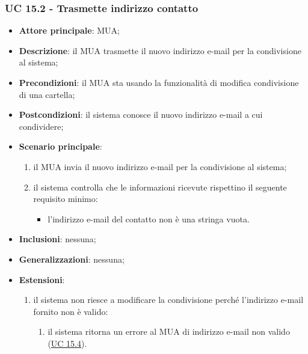     \subsubsection{UC 15.2 - Trasmette indirizzo contatto} \label{sec:UC15.2}
    \begin{itemize}
        \item \textbf{Attore principale}: MUA;
        \item \textbf{Descrizione}: il MUA trasmette il nuovo indirizzo e-mail per la condivisione al sistema;
        \item \textbf{Precondizioni}: il MUA sta usando la funzionalità di modifica condivisione di una cartella;
        \item \textbf{Postcondizioni}: il sistema conosce il nuovo indirizzo e-mail a cui condividere;
        \item \textbf{Scenario principale}:
            \begin{enumerate}
                \item il MUA invia il nuovo indirizzo e-mail per la condivisione al sistema;
                \item il sistema controlla che le informazioni ricevute rispettino il seguente requisito minimo:
                    \begin{itemize}
                        \item l'indirizzo e-mail del contatto non è una stringa vuota.
                    \end{itemize}
            \end{enumerate}
        \item \textbf{Inclusioni}: nessuna;
        \item \textbf{Generalizzazioni}: nessuna;
        \item \textbf{Estensioni}:
            \begin{enumerate}[label=\alph*.]
                \item il sistema non riesce a modificare la condivisione perché l'indirizzo e-mail fornito non è valido:
                \begin{enumerate}[label=\arabic*.]
                    \item il sistema ritorna un errore al MUA di indirizzo e-mail non valido (\hyperref[sec:UC15.4]{UC 15.4}).
                \end{enumerate}
            \end{enumerate}
    \end{itemize}


